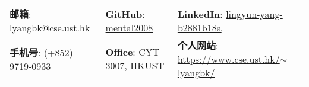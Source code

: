 \documentclass[letterpaper, 11pt]{article}
\begin{document}


\setlength{\tabcolsep}{8pt}


\vspace{0.5cm} 
\begin{center}
\begin{tabular}{lll}
\textbf{邮箱}: lyangbk@cse.ust.hk &
\hspace{0.25in} \textbf{GitHub}: \href{https://github.com/mental2008}{mental2008} &
\hspace{0.1in} \textbf{LinkedIn}: \href{https://www.linkedin.com/in/lingyun-yang-b2881b18a/}{lingyun-yang-b2881b18a} \\

\textbf{手机号}: (+852) 9719-0933 & 
\hspace{0.25in} \textbf{Office}: CYT 3007, HKUST & 
\hspace{0.1in} \textbf{个人网站}: \href{https://www.cse.ust.hk/~lyangbk/}{https://www.cse.ust.hk/$\sim$lyangbk/} \\ 
\end{tabular}
\end{center}
\end{document}
